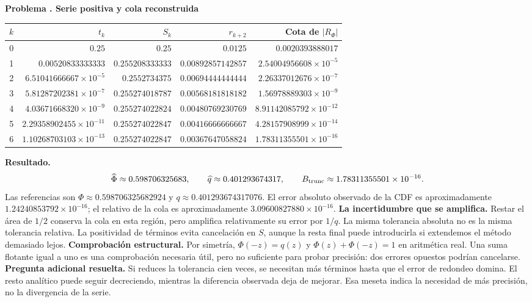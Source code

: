 \documentclass[11pt,a4paper]{article}
\theoremstyle{definition}
\newcounter{problema}
\newenvironment{resuelto}[1]{\refstepcounter{problema}\par\medskip\Needspace{6\baselineskip}\textbf{Problema \theproblema. #1}\par}{\par\medskip}
\begin{document}
\begin{resuelto}{Serie positiva y cola reconstruida}
\begin{center}\small\begin{tabular}{rrrrr}
\toprule
$k$&$t_k$&$S_k$&$r_{k+2}$&Cota de $|R_\Phi|$\\
\midrule
0&$0.25$&$0.25$&$0.0125$&$0.0020393888017$\\
1&$0.00520833333333$&$0.255208333333$&$0.00892857142857$&$2.54004956608\times10^{-5}$\\
2&$6.51041666667\times10^{-5}$&$0.2552734375$&$0.00694444444444$&$2.26337012676\times10^{-7}$\\
3&$5.81287202381\times10^{-7}$&$0.255274018787$&$0.00568181818182$&$1.56978889303\times10^{-9}$\\
4&$4.03671668320\times10^{-9}$&$0.255274022824$&$0.00480769230769$&$8.91142085792\times10^{-12}$\\
5&$2.29358902455\times10^{-11}$&$0.255274022847$&$0.00416666666667$&$4.28157908999\times10^{-14}$\\
6&$1.10268703103\times10^{-13}$&$0.255274022847$&$0.00367647058824$&$1.78311355501\times10^{-16}$\\
\bottomrule\end{tabular}\end{center}
\textbf{Resultado.}
\[
\widehat\Phi\approx0.598706325683,\qquad \widehat q\approx0.401293674317,\qquad B_{\rm trunc}\approx1.78311355501\times10^{-16}.
\]
Las referencias son $\Phi\approx0.598706325682924$ y $q\approx0.401293674317076$. El error absoluto observado de la CDF es aproximadamente $1.24240853792\times10^{-16}$; el relativo de la cola es aproximadamente $3.09600827880\times10^{-16}$.
\textbf{La incertidumbre que se amplifica.} Restar el área de $1/2$ conserva la cola en esta región, pero amplifica relativamente su error por $1/q$. La misma tolerancia absoluta no es la misma tolerancia relativa. La positividad de términos evita cancelación en $S$, aunque la resta final puede introducirla si extendemos el método demasiado lejos.
\textbf{Comprobación estructural.} Por simetría, $\Phi(-z)=q(z)$ y $\Phi(z)+\Phi(-z)=1$ en aritmética real. Una suma flotante igual a uno es una comprobación necesaria útil, pero no suficiente para probar precisión: dos errores opuestos podrían cancelarse.
\textbf{Pregunta adicional resuelta.} Si reduces la tolerancia cien veces, se necesitan más términos hasta que el error de redondeo domina. El resto analítico puede seguir decreciendo, mientras la diferencia observada deja de mejorar. Esa meseta indica la necesidad de más precisión, no la divergencia de la serie.
\end{resuelto}
\end{document}
